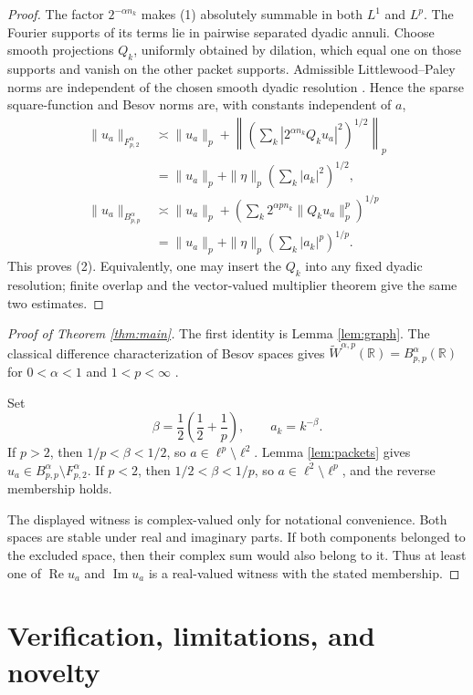 \documentclass[11pt]{article}
\newcommand{\R}{\mathbb R}
\newcommand{\Gag}{\widetilde W^{\alpha,p}(\R)}
\begin{document}
\begin{proof}
The factor $2^{-\alpha n_k}$ makes (1) absolutely summable in both $L^1$ and
$L^p$.  The Fourier supports of its terms lie in pairwise separated dyadic
annuli.  Choose smooth projections $Q_k$, uniformly obtained by dilation,
which equal one on those supports and vanish on the other packet supports.
Admissible Littlewood--Paley norms are independent of the chosen smooth
dyadic resolution \cite{Triebel}.  Hence the sparse square-function and Besov
norms are, with constants independent of $a$,
\begin{align*}
 \|u_a\|_{F^\alpha_{p,2}}
 &\asymp \|u_a\|_p+
 \left\|\left(\sum_k
 |2^{\alpha n_k}Q_ku_a|^2\right)^{1/2}\right\|_p\\
 &=\|u_a\|_p+\|\eta\|_p\left(\sum_k|a_k|^2\right)^{1/2},\\
 \|u_a\|_{B^\alpha_{p,p}}
 &\asymp \|u_a\|_p+
 \left(\sum_k2^{\alpha p n_k}\|Q_ku_a\|_p^p\right)^{1/p}\\
 &=\|u_a\|_p+\|\eta\|_p\left(\sum_k|a_k|^p\right)^{1/p}.
\end{align*}
This proves (2).  Equivalently, one may insert the $Q_k$ into any fixed
dyadic resolution; finite overlap and the vector-valued multiplier theorem
give the same two estimates.
\end{proof}

\begin{proof}[Proof of Theorem \ref{thm:main}]
The first identity is Lemma \ref{lem:graph}.  The classical difference
characterization of Besov spaces gives
$\Gag=B^\alpha_{p,p}(\R)$ for $0<\alpha<1$ and
$1<p<\infty$ \cite{Triebel}.

Set
\[
 \beta=\frac12\left(\frac12+\frac1p\right),
 \qquad a_k=k^{-\beta}.
\]
If $p>2$, then $1/p<\beta<1/2$, so
$a\in\ell^p\setminus\ell^2$.  Lemma \ref{lem:packets} gives
$u_a\in B^\alpha_{p,p}\setminus F^\alpha_{p,2}$.  If $p<2$, then
$1/2<\beta<1/p$, so $a\in\ell^2\setminus\ell^p$, and the reverse membership
holds.

The displayed witness is complex-valued only for notational convenience.
Both spaces are stable under real and imaginary parts.  If both components
belonged to the excluded space, then their complex sum would also belong to
it.  Thus at least one of $\operatorname{Re}u_a$ and
$\operatorname{Im}u_a$ is a real-valued witness with the stated membership.
\end{proof}

\section{Verification, limitations, and novelty}
\end{document}
